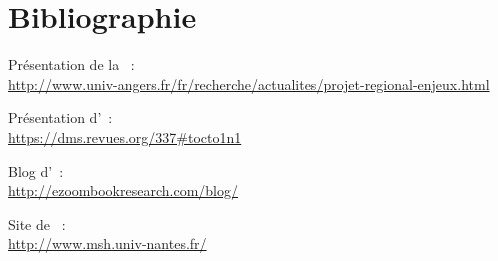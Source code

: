 \chapter*{Bibliographie}

Présentation de la \pe\ :\\
\url{http://www.univ-angers.fr/fr/recherche/actualites/projet-regional-enjeux.html}

Présentation d'\ezb\ :\\
\url{https://dms.revues.org/337#tocto1n1}

Blog d'\ezb\ :\\
\url{http://ezoombookresearch.com/blog/}

Site de \msh\ :\\
\url{http://www.msh.univ-nantes.fr/}